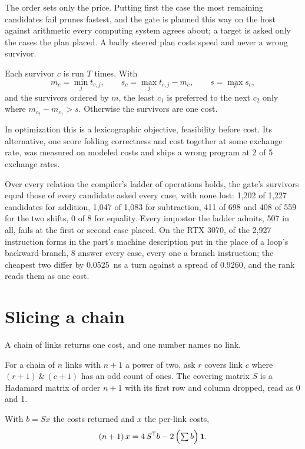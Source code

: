 The order sets only the price. Putting first the case the most remaining candidates fail prunes
fastest, and the gate is planned this way on the host against arithmetic every computing system
agrees about; a target is asked only the cases the plan placed. A badly steered plan costs speed
and never a wrong survivor.

\begin{definition}[Rank]
Each survivor \(c\) is run \(T\) times. With
\[
  m_c = \min_j t_{c,j}, \qquad s_c = \max_j t_{c,j} - m_c, \qquad s = \max_c s_c,
\]
and the survivors ordered by \(m\), the least \(c_1\) is preferred to the next \(c_2\) only where
\(m_{c_2} - m_{c_1} > s\). Otherwise the survivors are one cost.
\end{definition}

In optimization this is a lexicographic objective, feasibility before cost. Its alternative, one
score folding correctness and cost together at some exchange rate, was measured on modeled
costs and ships a wrong program at 2 of 5 exchange rates.

Over every relation the compiler's ladder of operations holds, the gate's survivors equal those
of every candidate asked every case, with none lost: 1,202 of 1,227 candidates for addition,
1,047 of 1,083 for subtraction, 411 of 698 and 408 of 559 for the two shifts, 0 of 8 for
equality. Every impostor the ladder admits, 507 in all, fails at the first or second case placed.
On the RTX 3070, of the 2,927 instruction forms in the part's machine description put in the
place of a loop's backward branch, 8 answer every case, every one a branch instruction; the
cheapest two differ by 0.0525~ns a turn against a spread of 0.9260, and the rank reads them as one
cost.

\section{Slicing a chain}

A chain of links returns one cost, and one number names no link.

\begin{definition}
For a chain of \(n\) links with \(n+1\) a power of two, ask \(r\) covers link \(c\) where
\((r+1)\,\&\,(c+1)\) has an odd count of ones. The covering matrix \(S\) is a Hadamard matrix of
order \(n+1\) with its first row and column dropped, read as 0 and 1.
\end{definition}

\begin{proposition}
\label{prop:slice}
With \(b = Sx\) the costs returned and \(x\) the per-link costs,
\[
  (n+1)\,x = 4\, S^{\mathsf T} b - 2\,\Bigl(\textstyle\sum b\Bigr)\,\mathbf 1.
\]
\end{proposition}

